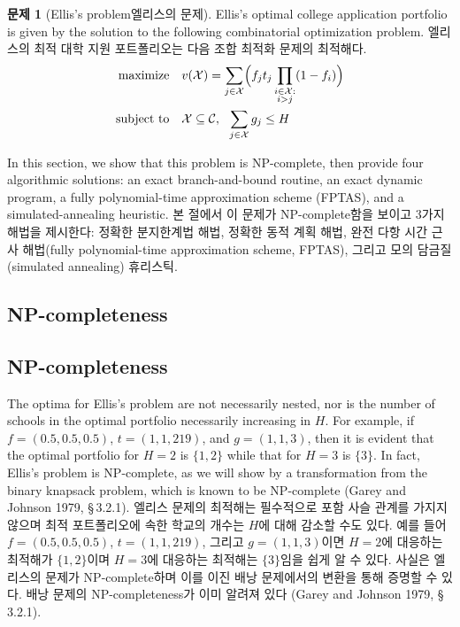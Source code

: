 \documentclass[11pt]{article} %
\theoremstyle{definition}
\newtheorem{problem}{Problem}
\theoremstyle{definition}
\newtheorem{problem}{문제}
\begin{document}
\begin{problem}[\ifen Ellis's problem\else 엘리스의 문제\fi]
\ifen
Ellis's optimal college application portfolio is given by the solution to the following combinatorial optimization problem.
\else 
엘리스의 최적 대학 지원 포트폴리오는 다음 조합 최적화 문제의 최적해다.
\fi
\begin{align}
\begin{split}
\text{maximize}\quad &  v(\mathcal{X}) = \sum_{j\in
\mathcal{X}} \Bigl(f_j t_j \prod_{\substack{i \in \mathcal{X}: \\ i > j}} (1 - f_{i}) \Bigr)\\
\text{subject to}\quad & \mathcal{X}\subseteq\mathcal{C},~~\sum_{j \in \mathcal{X}} g_j \leq H 
\end{split}
\end{align}
\end{problem}

\ifen
\noindent In this section, we show that this problem is NP-complete, then provide four algorithmic solutions: an exact branch-and-bound routine, an exact dynamic program, a fully polynomial-time approximation scheme (FPTAS), and a simulated-annealing heuristic. 
\else
\noindent 본 절에서 이 문제가 NP-complete함을 보이고 3가지 해법을 제시한다: 정확한 분지한계법 해법, 정확한 동적 계획 해법, 완전 다항 시간 근사 해법(fully polynomial-time approximation scheme, FPTAS), 그리고 모의 담금질(simulated annealing) 휴리스틱.
\fi

\ifen \subsection{NP-completeness} \else \subsection{NP-completeness}\fi
\ifen
The optima for Ellis's problem are not necessarily nested, nor is the number of schools in the optimal portfolio necessarily increasing in $H$. For example, if
$f = (0.5, 0.5, 0.5)$, $t = (1, 1, 219)$, and $g = (1, 1, 3)$,
then it is evident that the optimal portfolio for $H = 2$ is $\{1, 2\}$ while that for $H = 3$ is $\{3\}$. In fact, Ellis’s problem is NP-complete, as we will show by a transformation from the binary knapsack problem, which is known to be NP-complete (Garey and Johnson 1979, \S\,3.2.1).
\else
엘리스 문제의 최적해는 필수적으로 포함 사슬 관계를 가지지 않으며 최적 포트폴리오에 속한 학교의 개수는 $H$에 대해 감소할 수도 있다. 예를 들어
$f = (0.5, 0.5, 0.5)$, $t = (1, 1, 219)$, 그리고 $g = (1, 1, 3)$이면 $H = 2$에 대응하는 최적해가 $\{1, 2\}$이며 $H = 3$에 대응하는 최적해는 $\{3\}$임을 쉽게 알 수 있다. 사실은 엘리스의 문제가 NP-complete하며 이를 이진 배낭 문제에서의 변환을 통해 증명할 수 있다. 배낭 문제의 NP-completeness가 이미 알려져 있다 (Garey and Johnson 1979, \S\,3.2.1).
\fi
\end{document}
